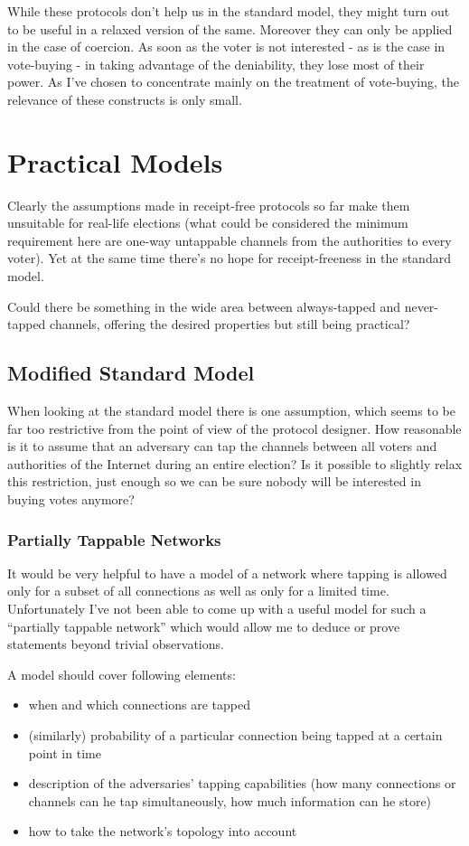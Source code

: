 \documentclass{article}
\begin{document}
While these protocols don't help us in the standard model, they might turn out to be useful in a relaxed version of the same. Moreover they can only be applied in the case of coercion. As soon as the voter is not interested - as is the case in vote-buying - in taking advantage of the deniability, they lose most of their power.
As I've chosen to concentrate mainly on the treatment of vote-buying, the relevance of these constructs is only small.



\section{Practical Models}
Clearly the assumptions made in receipt-free protocols so far make them unsuitable for real-life elections (what could be considered the minimum requirement here are one-way untappable channels from the authorities to every voter). Yet at the same time there's no hope for receipt-freeness in the standard model.

Could there be something in the wide area between always-tapped and never-tapped channels, offering the desired properties but still being practical?

\subsection{Modified Standard Model}
When looking at the standard model there is one assumption, which seems to be far too restrictive from the point of view of the protocol designer. How reasonable is it to assume that an adversary can tap the channels between all voters and authorities of the Internet during an entire election? Is it possible to slightly relax this restriction, just enough so we can be sure nobody will be interested in buying votes anymore?
 
\subsubsection{Partially Tappable Networks}
It would be very helpful to have a model of a network where tapping is allowed only for a subset of all connections as well as only for a limited time. Unfortunately I've not been able to come up with a useful model for such a ``partially tappable network'' which would allow me to deduce or prove statements beyond trivial observations.

A model should cover following elements:
\begin{itemize}
  \item  when and which connections are tapped
  \item (similarly) probability of a particular connection being tapped at a certain point in time
  \item description of the adversaries' tapping capabilities (how many connections or channels can he tap simultaneously, how much information can he store)
  \item how to take the network's topology into account
\end{itemize}
\end{document}

